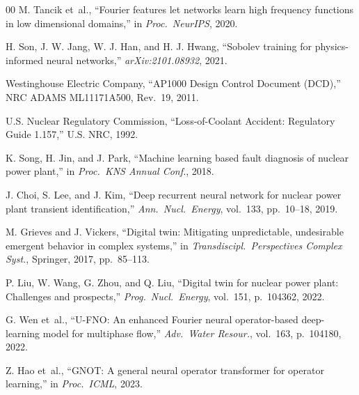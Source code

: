 \documentclass[conference]{IEEEtran}
\begin{document}
\begin{thebibliography}{00}
M. Tancik et~al.,
``Fourier features let networks learn high frequency functions in low dimensional domains,''
in \textit{Proc.\ NeurIPS}, 2020.

H. Son, J. W. Jang, W. J. Han, and H. J. Hwang,
``Sobolev training for physics-informed neural networks,''
\textit{arXiv:2101.08932}, 2021.

Westinghouse Electric Company,
``AP1000 Design Control Document (DCD),''
NRC ADAMS ML11171A500, Rev.~19, 2011.

U.S. Nuclear Regulatory Commission,
``Loss-of-Coolant Accident: Regulatory Guide 1.157,''
U.S. NRC, 1992.

K. Song, H. Jin, and J. Park,
``Machine learning based fault diagnosis of nuclear power plant,''
in \textit{Proc.\ KNS Annual Conf.}, 2018.

J. Choi, S. Lee, and J. Kim,
``Deep recurrent neural network for nuclear power plant transient identification,''
\textit{Ann.\ Nucl.\ Energy}, vol.~133, pp.~10--18, 2019.

M. Grieves and J. Vickers,
``Digital twin: Mitigating unpredictable, undesirable emergent behavior in complex systems,''
in \textit{Transdiscipl.\ Perspectives Complex Syst.}, Springer, 2017, pp.~85--113.

P. Liu, W. Wang, G. Zhou, and Q. Liu,
``Digital twin for nuclear power plant: Challenges and prospects,''
\textit{Prog.\ Nucl.\ Energy}, vol.~151, p.~104362, 2022.

G. Wen et~al.,
``U-FNO: An enhanced Fourier neural operator-based deep-learning model for multiphase flow,''
\textit{Adv.\ Water Resour.}, vol.~163, p.~104180, 2022.

Z. Hao et~al.,
``GNOT: A general neural operator transformer for operator learning,''
in \textit{Proc.\ ICML}, 2023.

\end{thebibliography}
\end{document}
